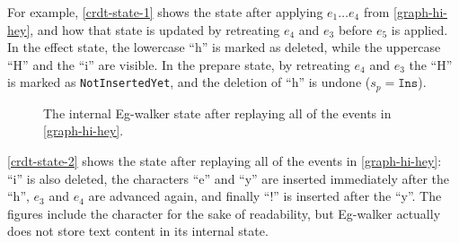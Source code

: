 \documentclass[sigplan,10pt]{acmart}
\newcommand{\algname}{Eg-walker\xspace}
\begin{document}
For example, \autoref{crdt-state-1} shows the state after applying $e_1 \dots e_4$ from \autoref{graph-hi-hey}, and how that state is updated by retreating $e_4$ and $e_3$ before $e_5$ is applied.
In the effect state, the lowercase ``h'' is marked as deleted, while the uppercase ``H'' and the ``i'' are visible.
In the prepare state, by retreating $e_4$ and $e_3$ the ``H'' is marked as \texttt{NotInsertedYet}, and the deletion of ``h'' is undone ($s_p = \texttt{Ins}$).

\begin{figure}
  \caption{The internal \algname state after replaying all of the events in \autoref{graph-hi-hey}.}
  \label{crdt-state-2}
\end{figure}

\autoref{crdt-state-2} shows the state after replaying all of the events in \autoref{graph-hi-hey}: ``i'' is also deleted, the characters ``e'' and ``y'' are inserted immediately after the ``h'', $e_3$ and $e_4$ are advanced again, and finally ``!'' is inserted after the ``y''.
The figures include the character for the sake of readability, but \algname actually does not store text content in its internal state.
\end{document}
